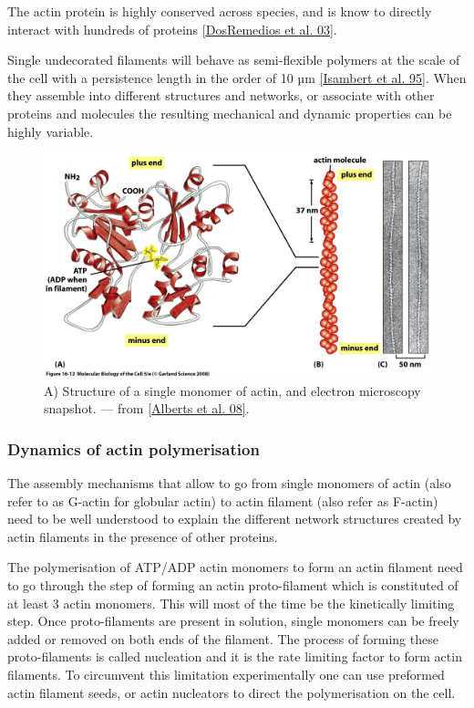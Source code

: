 \documentclass[A4paperpaper,11pt,english]{sphinxmanual}
\begin{document}
The actin protein is highly conserved across species, and is know to directly
interact with hundreds of proteins {\hyperref[parts/part1:dosremedios2003]{{[}DosRemedios et al. 03{]}}}.

Single undecorated filaments will behave  as
semi-flexible polymers at the scale of the cell with a persistence length in the order of 10 µm {\hyperref[parts/part1:isambert1995]{{[}Isambert et al. 95{]}}}. When they
assemble into different structures and networks, or associate with other proteins
and molecules the resulting mechanical and dynamic properties can be highly variable.
\begin{figure}[htbp]
\centering
\capstart

\includegraphics[width=0.700\linewidth]{actin-structure.jpg}
\caption{A) Structure of a single monomer of actin, and electron microscopy snapshot.
— from {\hyperref[parts/part1:alberts2008]{{[}Alberts et al. 08{]}}}.}\label{parts/part1:fig-actin}\end{figure}


\subsubsection{Dynamics of actin polymerisation}
\label{parts/part1:dynamics-of-actin-polymerisation}
The assembly mechanisms that allow to go from single monomers of actin (also
refer to as G-actin for globular actin) to actin filament (also refer as
F-actin) need to be well understood to explain the different network
structures created by actin filaments in the presence of other proteins.

The polymerisation of ATP/ADP actin monomers to form an actin filament need to
go through the step of forming an actin proto-filament which is constituted of
at least 3 actin monomers. This will most of the time be the kinetically
limiting step. Once proto-filaments are present in solution, single monomers
can be freely added or removed on both ends of the filament.  The process of
forming these proto-filaments is called nucleation and it is the rate limiting
factor to form actin filaments. To circumvent this
limitation experimentally one can use preformed actin filament seeds, or actin nucleators
to direct the polymerisation on the cell.
\end{document}
